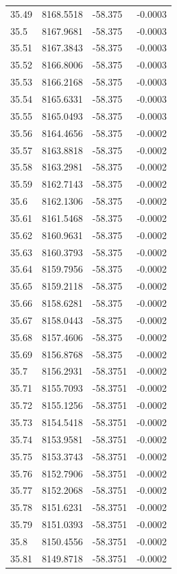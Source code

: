 \begin{table}[H]
\begin{tabular}{llll}
35.49 & 8168.5518 & -58.375 & -0.0003 \\
35.5 & 8167.9681 & -58.375 & -0.0003 \\
35.51 & 8167.3843 & -58.375 & -0.0003 \\
35.52 & 8166.8006 & -58.375 & -0.0003 \\
35.53 & 8166.2168 & -58.375 & -0.0003 \\
35.54 & 8165.6331 & -58.375 & -0.0003 \\
35.55 & 8165.0493 & -58.375 & -0.0003 \\
35.56 & 8164.4656 & -58.375 & -0.0002 \\
35.57 & 8163.8818 & -58.375 & -0.0002 \\
35.58 & 8163.2981 & -58.375 & -0.0002 \\
35.59 & 8162.7143 & -58.375 & -0.0002 \\
35.6 & 8162.1306 & -58.375 & -0.0002 \\
35.61 & 8161.5468 & -58.375 & -0.0002 \\
35.62 & 8160.9631 & -58.375 & -0.0002 \\
35.63 & 8160.3793 & -58.375 & -0.0002 \\
35.64 & 8159.7956 & -58.375 & -0.0002 \\
35.65 & 8159.2118 & -58.375 & -0.0002 \\
35.66 & 8158.6281 & -58.375 & -0.0002 \\
35.67 & 8158.0443 & -58.375 & -0.0002 \\
35.68 & 8157.4606 & -58.375 & -0.0002 \\
35.69 & 8156.8768 & -58.375 & -0.0002 \\
35.7 & 8156.2931 & -58.3751 & -0.0002 \\
35.71 & 8155.7093 & -58.3751 & -0.0002 \\
35.72 & 8155.1256 & -58.3751 & -0.0002 \\
35.73 & 8154.5418 & -58.3751 & -0.0002 \\
35.74 & 8153.9581 & -58.3751 & -0.0002 \\
35.75 & 8153.3743 & -58.3751 & -0.0002 \\
35.76 & 8152.7906 & -58.3751 & -0.0002 \\
35.77 & 8152.2068 & -58.3751 & -0.0002 \\
35.78 & 8151.6231 & -58.3751 & -0.0002 \\
35.79 & 8151.0393 & -58.3751 & -0.0002 \\
35.8 & 8150.4556 & -58.3751 & -0.0002 \\
35.81 & 8149.8718 & -58.3751 & -0.0002 \\

\end{tabular}
\end{table}
